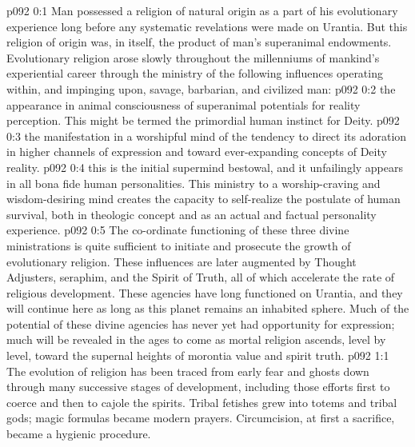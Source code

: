 \author{Melchizedek}
\vs p092 0:1 Man possessed a religion of natural origin as a part of his evolutionary experience long before any systematic revelations were made on Urantia. But this religion of  origin was, in itself, the product of man’s superanimal endowments. Evolutionary religion arose slowly throughout the millenniums of mankind’s experiential career through the ministry of the following influences operating within, and impinging upon, savage, barbarian, and civilized man:
\vs p092 0:2 \bibnobreakspace {} the appearance in animal consciousness of superanimal potentials for reality perception. This might be termed the primordial human instinct for Deity.
\vs p092 0:3 \bibnobreakspace {} the manifestation in a worshipful mind of the tendency to direct its adoration in higher channels of expression and toward ever\hyp{}expanding concepts of Deity reality.
\vs p092 0:4 \bibnobreakspace {} this is the initial supermind bestowal, and it unfailingly appears in all bona fide human personalities. This ministry to a worship\hyp{}craving and wisdom\hyp{}desiring mind creates the capacity to self\hyp{}realize the postulate of human survival, both in theologic concept and as an actual and factual personality experience.
\vs p092 0:5 \pc The co\hyp{}ordinate functioning of these three divine ministrations is quite sufficient to initiate and prosecute the growth of evolutionary religion. These influences are later augmented by Thought Adjusters, seraphim, and the Spirit of Truth, all of which accelerate the rate of religious development. These agencies have long functioned on Urantia, and they will continue here as long as this planet remains an inhabited sphere. Much of the potential of these divine agencies has never yet had opportunity for expression; much will be revealed in the ages to come as mortal religion ascends, level by level, toward the supernal heights of morontia value and spirit truth.
\vs p092 1:1 The evolution of religion has been traced from early fear and ghosts down through many successive stages of development, including those efforts first to coerce and then to cajole the spirits. Tribal fetishes grew into totems and tribal gods; magic formulas became modern prayers. Circumcision, at first a sacrifice, became a hygienic procedure.
